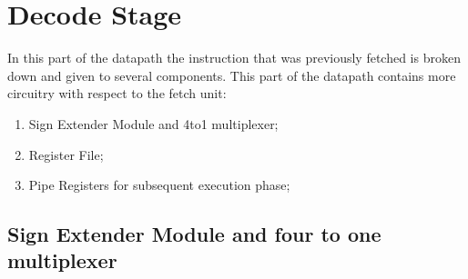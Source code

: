%
\chapter{Decode Stage}
\label{DecodeUnit}

In this part of the datapath the instruction that was previously fetched is broken down and given to several components.
This part of the datapath contains more circuitry with respect to the fetch unit:

\begin{enumerate}
    \item Sign Extender Module and 4to1 multiplexer;
    \item Register File;
    \item Pipe Registers for subsequent execution phase;
    \end{enumerate}

\section {Sign Extender Module and four to one multiplexer}

